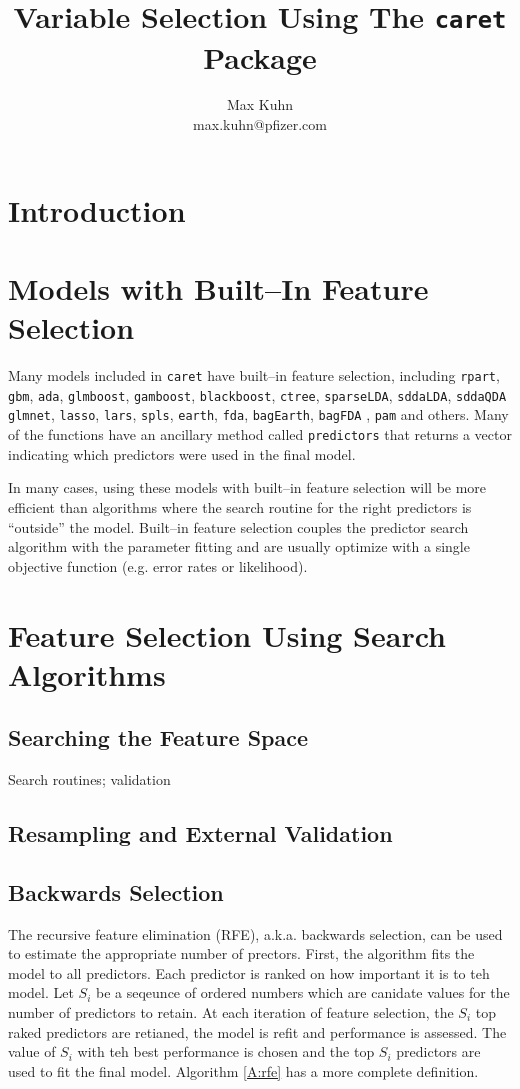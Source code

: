 \documentclass[12pt]{article}
\title{Variable Selection Using The {\tt caret} Package}
\author{Max Kuhn \\ max.kuhn@pfizer.com}
\begin{document}
\section{Introduction}

\section{Models with Built--In Feature Selection}

Many models included in \texttt{caret} have built--in feature selection, including \texttt{rpart}, \texttt{gbm}, \texttt{ada}, \texttt{glmboost}, \texttt{gamboost}, \texttt{blackboost}, \texttt{ctree}, \texttt{sparseLDA}, \texttt{sddaLDA}, \texttt{sddaQDA}	\texttt{glmnet}, \texttt{lasso}, \texttt{lars}, \texttt{spls}, \texttt{earth}, \texttt{fda},   \texttt{bagEarth}, \texttt{bagFDA} , \texttt{pam} and others. Many of the functions have an ancillary method called \texttt{predictors} that returns a vector indicating which predictors were used in the final model.

In many cases, using these models with built--in feature selection will be more efficient than algorithms where the search routine for the right predictors is ``outside'' the model. Built--in feature selection couples the predictor search algorithm with the parameter fitting and are usually optimize with a single objective function (e.g. error rates or likelihood). 


\section{Feature Selection Using Search Algorithms}

\subsection{Searching the Feature Space}
Search routines; validation 

\subsection{Resampling and External Validation}

\subsection{Backwards Selection}

The recursive feature elimination (RFE), a.k.a. backwards selection, can be used to estimate the appropriate number of prectors. First, the algorithm fits the model to all predictors. Each predictor is ranked on how important it is to teh model. Let $S_i$ be a seqeunce of ordered numbers which are canidate values for the number of predictors to retain. At each iteration of feature selection, the $S_i$ top raked predictors are retianed, the model is refit and performance is assessed. The value of $S_i$ with teh best performance is chosen and the top $S_i$ predictors are used to fit the final model. Algorithm \ref{A:rfe} has a more complete definition.
\end{document}
